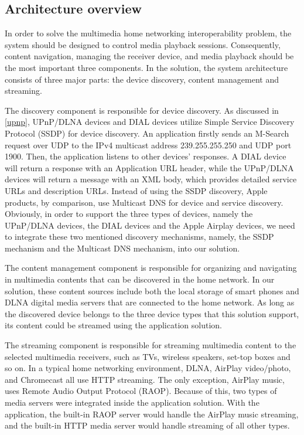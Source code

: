 \subsection{Architecture overview\label{3_1}}
In order to solve the multimedia home networking interoperability problem, the
system should be designed to control media playback sessions. Consequently,
content navigation, managing the receiver device, and media playback should be
the most important three components. In the solution, the system architecture
consists of three major parts: the device discovery, content management and streaming.

The discovery component is responsible for device discovery. As discussed
in \ref{upnp}, UPnP/DLNA devices and DIAL devices utilize Simple Service Discovery
Protocol (SSDP) for device discovery. An application firstly sends an M-Search
request over UDP to the IPv4 multicast address 239.255.255.250 and UDP port
1900. Then, the application listens to other devices' responses. A DIAL device
will return a response with an Application URL header, while the UPnP/DLNA
devices will return a message with an XML body, which provides detailed service
URLs and description URLs. Instead of using the SSDP discovery, Apple products,
by comparison, use Multicast DNS for device and service discovery. Obviously,
in order to support the three types of devices, namely the UPnP/DLNA devices,
the DIAL devices and the Apple Airplay devices, we need to integrate these two
mentioned discovery mechanisms, namely, the SSDP mechanism and the Multicast
DNS mechanism, into our solution.

The content management component is responsible for organizing and navigating
in multimedia contents that can be discovered in the home network. In our
solution, these content sources include both the local storage of smart phones
and DLNA digital media servers that are connected to the home network. As long
as the discovered device belongs to the three device types that this solution
support, its content could be streamed using the application solution.

The streaming component is responsible for streaming multimedia content to the
selected multimedia receivers, such as TVs, wireless speakers, set-top boxes and so on. In a typical home networking environment, DLNA, AirPlay video/photo, and Chromecast all use HTTP streaming. The only exception, AirPlay music, uses Remote Audio Output Protocol (RAOP). Because of this, two types of media servers were integrated inside the application solution. With the application, the built-in RAOP server would handle the AirPlay music streaming, and the built-in HTTP media server would handle streaming of all other types.

